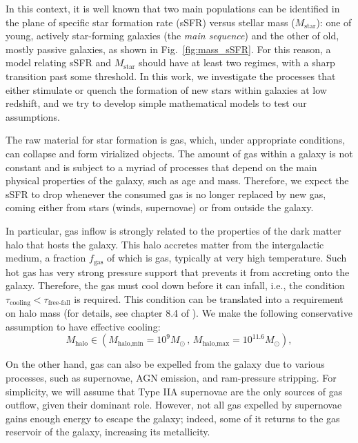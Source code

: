 \documentclass[fleqn,usenatbib]{mnras}
\begin{document}
In this context, it is well known \citep[e.g.,][]{Kauffmann_2003} that two main populations can be identified in the plane of specific star formation rate (sSFR) versus stellar mass ($M_{\text{star}}$): one of young, actively star-forming galaxies (the \textit{main sequence}) and the other of old, mostly passive galaxies, as shown in Fig.~\ref{fig:mass_sSFR}. For this reason, a model relating sSFR and $M_{\text{star}}$ should have at least two regimes, with a sharp transition past some threshold. In this work, we investigate the processes that either stimulate or quench the formation of new stars within galaxies at low redshift, and we try to develop simple mathematical models to test our assumptions.

The raw material for star formation is gas, which, under appropriate conditions, can collapse and form virialized objects. The amount of gas within a galaxy is not constant and is subject to a myriad of processes that depend on the main physical properties of the galaxy, such as age and mass. Therefore, we expect the sSFR to drop whenever the consumed gas is no longer replaced by new gas, coming either from stars (winds, supernovae) or from outside the galaxy. 

In particular, gas inflow is strongly related to the properties of the dark matter halo that hosts the galaxy. This halo accretes matter from the intergalactic medium, a fraction $f_{\text{gas}}$ of which is gas, typically at very high temperature. Such hot gas has very strong pressure support that prevents it from accreting onto the galaxy. Therefore, the gas must cool down before it can infall, i.e., the condition $\tau_{\text{cooling}} < \tau_{\text{free-fall}}$ is required. This condition can be translated into a requirement on halo mass (for details, see chapter 8.4 of \citet{galaxy_formation_and_evolution_2010}). We make the following conservative assumption to have effective cooling:
\begin{equation}
    M_{\text{halo}} \in \left( M_{\text{halo,min}}=10^9 M_\odot \, , \, M_{\text{halo,max}}=10^{11.6} M_\odot \right),
	\label{eq:halo_mass_minmax}
\end{equation}

On the other hand, gas can also be expelled from the galaxy due to various processes, such as supernovae, AGN emission, and ram-pressure stripping. For simplicity, we will assume that Type IIA supernovae are the only sources of gas outflow, given their dominant role. However, not all gas expelled by supernovae gains enough energy to escape the galaxy; indeed, some of it returns to the gas reservoir of the galaxy, increasing its metallicity. 
\end{document}
